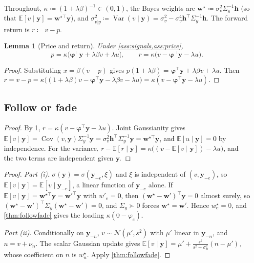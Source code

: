 \documentclass{article}
\theoremstyle{plain}
\newtheorem{lemma}[theorem]{Lemma}
\theoremstyle{definition}
\theoremstyle{remark}
\newcommand{\E}{\mathbb{E}}
\newcommand{\N}{\mathcal{N}}
\newcommand{\w}{\bm{w}}
\newcommand{\y}{\bm{y}}
\newcommand{\h}{\bm{h}}
\newcommand{\bphi}{\bm{\varphi}}
\DeclareMathOperator{\Var}{Var}
\DeclareMathOperator{\Cov}{Cov}
\begin{document}
Throughout, $\kappa\coloneqq(1+\lambda\beta)^{-1}\in(0,1)$, the Bayes weights are $\w^\star\coloneqq\sigma_v^2\Sigma_y^{-1}\h$ (so that $\E[v\mid\y]=\w^{\star\top}\y$), and $\sigma^2_{v|y}\coloneqq\Var(v\mid\y)=\sigma_v^2-\sigma_v^4\h^\top\Sigma_y^{-1}\h$. The forward return is $r\coloneqq v-p$.
\begin{lemma}[Price and return]\label{lem:price}
Under \cref{ass:signals,ass:price},
\[
  p=\kappa\big(\bphi^\top\y+\lambda\beta v+\lambda u\big),\qquad r=\kappa\big(v-\bphi^\top\y-\lambda u\big).
\]
\end{lemma}
\begin{proof}
Substituting $x=\beta(v-p)$ gives $p(1+\lambda\beta)=\bphi^\top\y+\lambda\beta v+\lambda u$. Then $r=v-p=\kappa\big((1+\lambda\beta)v-\bphi^\top\y-\lambda\beta v-\lambda u\big)=\kappa(v-\bphi^\top\y-\lambda u)$.
\end{proof}

\subsection{Follow or fade}
\thmfollowfade*
\begin{proof}
By \cref{lem:price}, $r=\kappa(v-\bphi^\top\y-\lambda u)$. Joint Gaussianity gives $\E[v\mid\y]=\Cov(v,\y)\Sigma_y^{-1}\y=\sigma_v^2\h^\top\Sigma_y^{-1}\y=\w^{\star\top}\y$, and $\E[u\mid\y]=0$ by independence. For the variance, $r-\E[r\mid\y]=\kappa\big((v-\E[v\mid\y])-\lambda u\big)$, and the two terms are independent given $\y$.
\end{proof}

\corecho*
\begin{proof}
\emph{Part (i).}
$\sigma(\y)=\sigma(\y_{-e},\xi)$ and $\xi$ is independent of $(v,\y_{-e})$, so $\E[v\mid\y]=\E[v\mid\y_{-e}]$, a linear function of $\y_{-e}$ alone. If $\E[v\mid\y]=\w^{\star\top}\y=\w'^{\top}\y$ with $w'_e=0$, then $(\w^\star-\w')^\top\y=0$ almost surely, so $(\w^\star-\w')^\top\Sigma_y(\w^\star-\w')=0$, and $\Sigma_y\succ0$ forces $\w^\star=\w'$. Hence $w^\star_e=0$, and \cref{thm:followfade} gives the loading $\kappa(0-\varphi_e)$.

\emph{Part (ii).}
Conditionally on $\y_{-n}$, $v\sim\N(\mu',s^2)$ with $\mu'$ linear in $\y_{-n}$, and $n=v+\nu_n$. The scalar Gaussian update gives $\E[v\mid\y]=\mu'+\frac{s^2}{s^2+\sigma_n^2}(n-\mu')$, whose coefficient on $n$ is $w^\star_n$. Apply \cref{thm:followfade}.
\end{proof}
\end{document}

